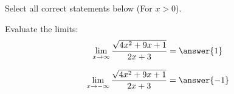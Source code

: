 \documentclass{ximera}
\author{Nela Lakos \and Kyle Parsons}
\begin{document}
\begin{exercise}

    Select all correct statements below (For $x > 0$).
    
    \begin{selectAll}
    \end{selectAll}

	\begin{exercise}
		Evaluate the limits:
		\[ \lim_{x \to \infty} \frac{\sqrt{4x^2+9x+1}}{2x+3} = \answer{1} \]
		
		\[ \lim_{x \to -\infty} \frac{\sqrt{4x^2+9x+1}}{2x+3} = \answer{-1} \]
	\end{exercise}


\end{exercise}
\end{document}
